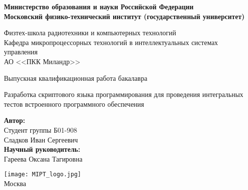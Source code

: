 \begin{center}
    \large\textbf{Министерство образования и науки Российской Федерации \\
    Московский физико-технический институт (государственный
    университет)} \\
    \vspace{1cm}

    Физтех-школа радиотехники и компьютерных технологий \\

    Кафедра микропроцессорных технологий в интеллектуальных системах управления \\
    АО <<ПКК Миландр>>\\

    \vspace{3em}

    Выпускная квалификационная работа бакалавра
\end{center}

\begin{center}
    \vspace{\fill}
    \LARGE{Разработка скриптового языка программирования для проведения интегральных тестов встроенного программного обеспечения}

    \vspace{\fill}
\end{center}


\begin{flushright}
    \textbf{Автор:} \\
    Студент группы Б01-908 \\
    Сладков Иван Сергеевич \\
    \vspace{2em}
    \textbf{Научный руководитель:} \\
    Гареева Оксана Тагировна \\
    \vspace{2em}
\end{flushright}

\vspace{7em}

\begin{center}
    \texttt{[image: MIPT\_logo.jpg]}\\
    Москва \the\year{}
\end{center}

\thispagestyle{empty}

\newpage
\setcounter{page}{2}
\fancyfoot[c]{\thepage}
\fancyhead[R]{}